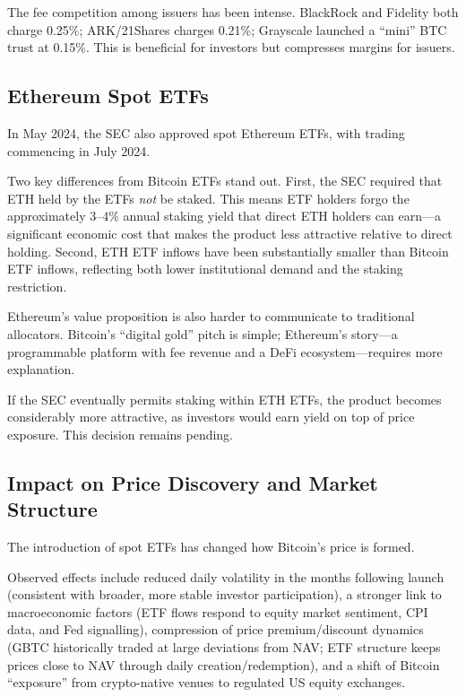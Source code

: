 \documentclass[11pt,a4paper]{article}
\begin{document}
The fee competition among issuers has been intense. BlackRock and Fidelity both charge 0.25\%; ARK/21Shares charges 0.21\%; Grayscale launched a ``mini'' BTC trust at 0.15\%. This is beneficial for investors but compresses margins for issuers.

\subsection{Ethereum Spot ETFs}

In May 2024, the SEC also approved spot Ethereum ETFs, with trading commencing in July 2024.

Two key differences from Bitcoin ETFs stand out. First, the SEC required that ETH held by the ETFs \textit{not} be staked. This means ETF holders forgo the approximately 3--4\% annual staking yield that direct ETH holders can earn---a significant economic cost that makes the product less attractive relative to direct holding. Second, ETH ETF inflows have been substantially smaller than Bitcoin ETF inflows, reflecting both lower institutional demand and the staking restriction.

Ethereum's value proposition is also harder to communicate to traditional allocators. Bitcoin's ``digital gold'' pitch is simple; Ethereum's story---a programmable platform with fee revenue and a DeFi ecosystem---requires more explanation.

If the SEC eventually permits staking within ETH ETFs, the product becomes considerably more attractive, as investors would earn yield on top of price exposure. This decision remains pending.

\subsection{Impact on Price Discovery and Market Structure}

The introduction of spot ETFs has changed how Bitcoin's price is formed.

Observed effects include reduced daily volatility in the months following launch (consistent with broader, more stable investor participation), a stronger link to macroeconomic factors (ETF flows respond to equity market sentiment, CPI data, and Fed signalling), compression of price premium/discount dynamics (GBTC historically traded at large deviations from NAV; ETF structure keeps prices close to NAV through daily creation/redemption), and a shift of Bitcoin ``exposure'' from crypto-native venues to regulated US equity exchanges.
\end{document}
